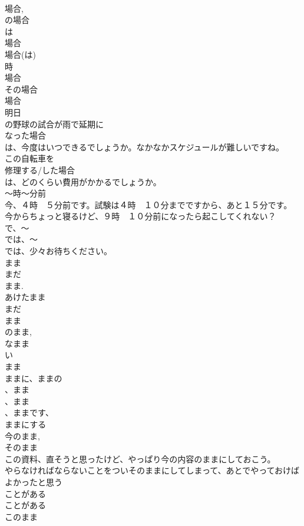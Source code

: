 \documentclass[8pt]{extreport}
\begin{document}
\begin{CJK}{UTF8}{min}
\\	場合, 
\\	の場合
\\	は 
\\	場合
\\	場合(は)
\\	時
\\	場合
\\	その場合 
\\	場合 
\\	明日
\\	の野球の試合が雨で延期に
\\	なった場合
\\	は、今度はいつできるでしょうか。なかなかスケジュールが難しいですね。
\\	この自転車を
\\	修理する/した場合
\\	は、どのくらい費用がかかるでしょうか。
\\	～時～分前
\\	今、４時　５分前です。試験は４時　１０分までですから、あと１５分です。
\\	今からちょっと寝るけど、９時　１０分前になったら起こしてくれない？
\\	で、～
\\	では、～
\\	では、少々お待ちください。
\\	まま
\\	まだ
\\	まま. 
\\	あけたまま
\\	まだ
\\	まま
\\	のまま, 
\\	なまま
\\	い
\\	まま
\\	ままに、ままの
\\	、まま
\\	、まま
\\	、ままです、
\\	ままにする　
\\	今のまま, 
\\	そのまま 
\\	この資料、直そうと思ったけど、やっぱり今の内容のままにしておこう。
\\	やらなければならないことをついそのままにしてしまって、あとでやっておけばよかったと思う
\\	ことがある
\\	ことがある
\\	このまま

\end{CJK}
\end{document}
